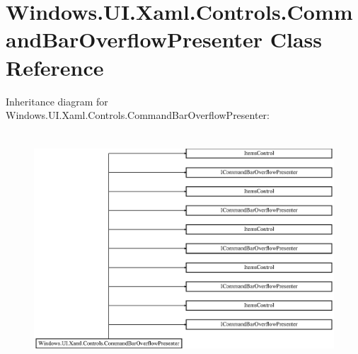 \hypertarget{class_windows_1_1_u_i_1_1_xaml_1_1_controls_1_1_command_bar_overflow_presenter}{}\section{Windows.\+U\+I.\+Xaml.\+Controls.\+Command\+Bar\+Overflow\+Presenter Class Reference}
\label{class_windows_1_1_u_i_1_1_xaml_1_1_controls_1_1_command_bar_overflow_presenter}
Inheritance diagram for Windows.\+U\+I.\+Xaml.\+Controls.\+Command\+Bar\+Overflow\+Presenter\+:\begin{figure}[H]
\begin{center}
\leavevmode
\includegraphics[height=8.700564cm]{class_windows_1_1_u_i_1_1_xaml_1_1_controls_1_1_command_bar_overflow_presenter}
\end{center}
\end{figure}
